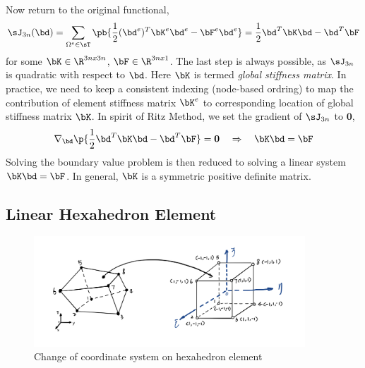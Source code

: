 \documentclass[11pt,titlepage]{article}
\begin{document}
Now return to the original functional,
\[
    \sJ_{3n}(\bd) = 
        \sum_{\Omega^e \in \sT} \pb{
            \frac{1}{2} (\bd^e)^T \bK^e \bd^e
                - \bF^e \bd^e
        }
        =
        \frac{1}{2} \bd^T \bK \bd - \bd^T \bF
\]
for some $\bK\in\R^{3nx3n}$, $\bF\in\R^{3nx1}$. The last step is always possible, as $\sJ_{3n}$ is quadratic with respect to $\bd$. Here $\bK$ is termed \textit{global stiffness matrix}. In practice, we need to keep a consistent indexing (node-based ordring) to map the contribution of element stiffness matrix $\bK^e$ to corresponding location of global stiffness matrix $\bK$. In spirit of Ritz Method, we set the gradient of $\sJ_{3n}$ to $\mathbf{0}$,
\[
    \nabla_{\bd} \p{\frac{1}{2} \bd^T \bK \bd - \bd^T \bF} = \mathbf{0}
    \quad\Rightarrow\quad
    \bK \bd = \bF
\]
Solving the boundary value problem is then reduced to solving a linear system $\bK \bd = \bF$. In general, $\bK$ is a symmetric positive definite matrix.


\subsection{Linear Hexahedron Element}

\begin{figure}[!htbp]
    \begin{center}
        \includegraphics[width=4in]{screenshots/hex_element_cov}
        \caption{Change of coordinate system on hexahedron element}
    \end{center}
\end{figure}
\end{document}
